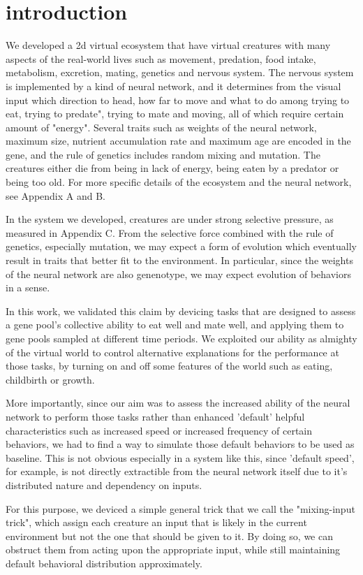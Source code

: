 \documentclass{amsart}
\theoremstyle{definition}
\theoremstyle{remark}
\numberwithin{equation}{section}
\begin{document}
\section{introduction}
	We developed a 2d virtual ecosystem that have virtual creatures with many aspects of the real-world lives such as movement, predation, food intake, metabolism, excretion, mating, genetics and nervous system. The nervous system is implemented by a kind of neural network, and it determines from the visual input which direction to head, how far to move and what to do among trying to eat, trying to predate",  trying to mate and moving, all of which require certain amount of "energy". Several traits such as weights of the neural network, maximum size, nutrient accumulation rate and maximum age are encoded in the gene, and the rule  of genetics includes random mixing and mutation. The creatures either die from being in lack of energy, being eaten by a predator or being too old. For more specific details of the ecosystem and the neural network, see Appendix A and B.
	
	In the system we developed, creatures are under strong selective pressure, as measured in Appendix C. From the selective force combined with the rule of genetics, especially mutation, we may expect a form of evolution which eventually result in traits that better fit to the environment. In particular, since the weights of the neural network are also genenotype, we may expect evolution of behaviors in a sense. 
	
	In this work, we validated this claim by devicing tasks that are designed to assess a gene pool's collective ability to eat well and mate well, and applying them to gene pools sampled at different time periods. We exploited our ability as almighty of the virtual world to control alternative explanations for the performance at those tasks, by turning on and off some features of the world such as eating, childbirth or growth.
	
	More importantly, since our aim was to assess the increased ability of the neural network to perform those tasks rather than enhanced 'default' helpful characteristics such as increased speed or increased frequency of certain behaviors, we had to find a way to simulate those default behaviors to be used as baseline. This is not obvious especially in a system like this, since 'default speed', for example, is not directly extractible from the neural network itself due to it's distributed nature and dependency on inputs. 
	
	For this purpose, we deviced a simple  general trick that we call the "mixing-input trick", which assign each creature an input that is likely in the current environment but not the one that should be given to it. By doing so, we can obstruct them from acting upon the appropriate input, while still maintaining default behavioral distribution approximately. 
	
\end{document}
